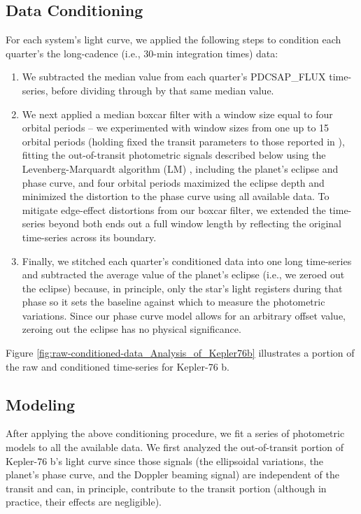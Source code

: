 \documentclass[manuscript]{aastex62}
\begin{document}
\subsection{Data Conditioning}
For each system's light curve, we applied the following steps to condition each quarter's the long-cadence (i.e., 30-min integration times) data:
\begin{enumerate}
\item We subtracted the median value from each quarter's PDCSAP\_FLUX time-series, before dividing through by that same median value.
\item We next applied a median boxcar filter with a window size equal to four orbital periods -- we experimented with window sizes from one up to 15 orbital periods (holding fixed the transit parameters to those reported in \citealt{2013ApJ...771...26F}), fitting the out-of-transit photometric signals described below using the Levenberg-Marquardt algorithm (LM) \citep{newville_2014_11813}, including the planet's eclipse and phase curve, and four orbital periods maximized the eclipse depth and minimized the distortion to the phase curve using all available data. To mitigate edge-effect distortions from our boxcar filter, we extended the time-series beyond both ends out a full window length by reflecting the original time-series across its boundary.
\item Finally, we stitched each quarter's conditioned data into one long time-series and subtracted the average value of the planet's eclipse (i.e., we zeroed out the eclipse) because, in principle, only the star's light registers during that phase so it sets the baseline against which to measure the photometric variations. Since our phase curve model allows for an arbitrary offset value, zeroing out the eclipse has no physical significance.
\end{enumerate}
Figure \ref{fig:raw-conditioned-data_Analysis_of_Kepler76b} illustrates a portion of the raw and conditioned time-series for Kepler-76 b. 

\subsection{Modeling}
After applying the above conditioning procedure, we fit a series of photometric models to all the available data. We first analyzed the out-of-transit portion of Kepler-76 b's light curve since those signals (the ellipsoidal variations, the planet's phase curve, and the Doppler beaming signal) are independent of the transit and can, in principle, contribute to the transit portion (although in practice, their effects are negligible). 
\end{document}
